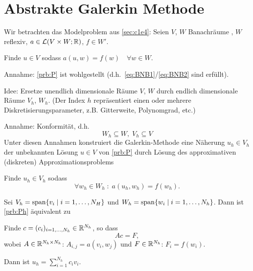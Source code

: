 \documentclass[../skript.tex]{subfiles}
\begin{document}
\section{Abstrakte Galerkin Methode}
\label{sec:c1e6}
Wir betrachten das Modelproblem aus \cref{sec:c1e4}:
Seien $V$, $W$ Banachräume , $W$ reflexiv, $a\in\mathcal{L}(V\times W;\mathbb{R})$, $ f \in W'$.
\addtocounter{problem}{-2}
\begin{problem} %
Finde $u \in V$ sodass $a(u, w) = f(w) \quad \forall w \in W$.
\end{problem}
\addtocounter{problem}{1}
Annahme: \cref{prb:P} ist wohlgestellt (d.h.\ \cref{eq:BNB1}\slash{}\cref{eq:BNB2} sind erfüllt).

Idee: Ersetze unendlich dimensionale Räume $V$, $W$ durch endlich dimensionale Räume $V_h$, $W_h$. (Der Index $h$ repräsentiert einen oder mehrere Diskretisierungsparameter, z.B. Gitterweite, Polynomgrad, etc.)

Annahme: Konformität, d.h.
\[
	W_h \subseteq W, \; V_h \subseteq V 
\]
Unter diesen Annahmen konstruiert die Galerkin-Methode eine Näherung
$u_h\in V_h$ der unbekannten Lösung $u\in V$ von \cref{prb:P} durch Lösung
des approximativen (diskreten) Approximationsproblems
\begin{problem} %
\label{prb:Ph}
Finde $u_h \in V_h$ sodass
\[
	\forall w_h \in W_h \; : \; a(u_h, w_h) = f(w_h).
\]
\end{problem}

Sei $V_h = \operatorname*{span} \{v_i \mid i = 1,\ldots,N_H\}$ und $W_h = \operatorname*{span}\{w_i \mid i=1,\ldots,N_h\}$.
Dann ist \cref{prb:Ph} äquivalent zu
\begin{problem}
Finde $c=(c_i)_{i=1,\ldots,N_h}\in\mathbb{R}^{N_h}$, so dass 
\[Ac=F,\]
wobei $A\in\mathbb{R}^{N_h\times N_h}$: $A_{i,j}=a(v_i,w_j)$ und 
$F\in\mathbb{R}^{N_h}$: $F_i=f(w_i)$.
\end{problem}
Dann ist $u_h = \sum_{i=1}^{N_h}c_i v_i$.
\end{document}
